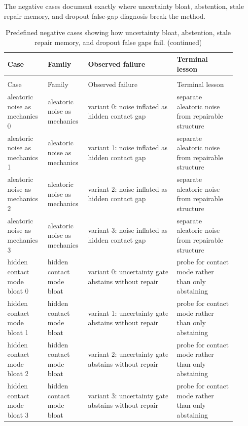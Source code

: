 \documentclass{article}
\begin{document}
The negative cases document exactly where uncertainty bloat, abstention, stale repair memory, and dropout false-gap diagnosis break the method.

\begin{center}
\scriptsize
\begin{longtable}{@{}p{0.16\linewidth}p{0.16\linewidth}p{0.36\linewidth}p{0.24\linewidth}@{}}
\caption{Predefined negative cases showing how uncertainty bloat, abstention, stale repair memory, and dropout false gaps fail.}\label{tab:negative}\\
\toprule
Case & Family & Observed failure & Terminal lesson\\
\midrule
\endfirsthead
\caption[]{Predefined negative cases showing how uncertainty bloat, abstention, stale repair memory, and dropout false gaps fail. (continued)}\\
\toprule
Case & Family & Observed failure & Terminal lesson\\
\midrule
\endhead
aleatoric noise as mechanics 0 & aleatoric noise as mechanics & variant 0: noise inflated as hidden contact gap & separate aleatoric noise from repairable structure\\
aleatoric noise as mechanics 1 & aleatoric noise as mechanics & variant 1: noise inflated as hidden contact gap & separate aleatoric noise from repairable structure\\
aleatoric noise as mechanics 2 & aleatoric noise as mechanics & variant 2: noise inflated as hidden contact gap & separate aleatoric noise from repairable structure\\
aleatoric noise as mechanics 3 & aleatoric noise as mechanics & variant 3: noise inflated as hidden contact gap & separate aleatoric noise from repairable structure\\
hidden contact mode bloat 0 & hidden contact mode bloat & variant 0: uncertainty gate abstains without repair & probe for contact mode rather than only abstaining\\
hidden contact mode bloat 1 & hidden contact mode bloat & variant 1: uncertainty gate abstains without repair & probe for contact mode rather than only abstaining\\
hidden contact mode bloat 2 & hidden contact mode bloat & variant 2: uncertainty gate abstains without repair & probe for contact mode rather than only abstaining\\
hidden contact mode bloat 3 & hidden contact mode bloat & variant 3: uncertainty gate abstains without repair & probe for contact mode rather than only abstaining\\

\end{longtable}
\end{center}
\end{document}
